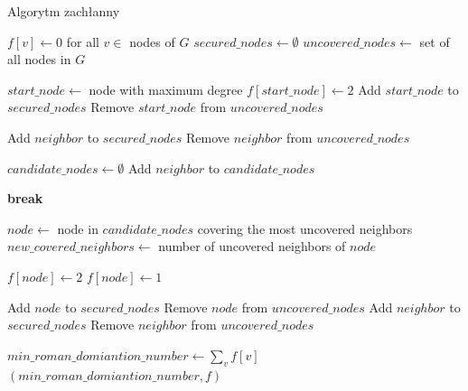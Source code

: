     \begin{algorithm}
    \caption*{Algorytm zachłanny}
    \begin{algorithmic}[1]
        \State $f[v] \gets 0$ for all $v \in$ nodes of $G$
        \State $secured\_nodes \gets \emptyset$
        \State $uncovered\_nodes \gets$ set of all nodes in $G$

        \State $start\_node \gets$ node with maximum degree
        \State $f[start\_node] \gets 2$
        \State Add $start\_node$ to $secured\_nodes$
        \State Remove $start\_node$ from $uncovered\_nodes$
        
            \State Add $neighbor$ to $secured\_nodes$
            \State Remove $neighbor$ from $uncovered\_nodes$
        \EndFor

            \State $candidate\_nodes \gets \emptyset$
                        \State Add $neighbor$ to $candidate\_nodes$
                    \EndIf
                \EndFor
            \EndFor

                \State \textbf{break}
            \EndIf

            \State $node \gets$ node in $candidate\_nodes$ covering the most uncovered neighbors
            \State $new\_covered\_neighbors \gets$ number of uncovered neighbors of $node$

                \State $f[node] \gets 2$
            \Else
                \State $f[node] \gets 1$
            \EndIf

            \State Add $node$ to $secured\_nodes$
            \State Remove $node$ from $uncovered\_nodes$
                \State Add $neighbor$ to $secured\_nodes$
                \State Remove $neighbor$ from $uncovered\_nodes$
            \EndFor
        \EndWhile

        \State $min\_roman\_domiantion\_number \gets \sum_{v} f[v]$
        \State \Return $(min\_roman\_domiantion\_number, f)$
        \EndFunction
    \end{algorithmic}
\end{algorithm}
